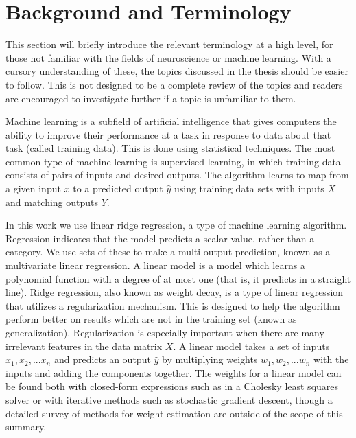 \section{Background and Terminology}

This section will briefly introduce the relevant terminology at a high level, 
for those not familiar with the fields of neuroscience or machine learning.  
With a cursory understanding of these, the topics discussed in the thesis 
should be easier to follow. This is not designed to be a complete review of the 
topics and readers are encouraged to investigate further if a topic is 
unfamiliar to them.

Machine learning is a subfield of artificial intelligence that gives computers 
the ability to improve their performance at a task in response to data about 
that task (called training data). This is done using statistical techniques.  
The most common type of machine learning is supervised learning, in which 
training data consists of pairs of inputs and desired outputs. The algorithm 
learns to map from a given input $x$ to a predicted output $\hat{y}$ using 
training data sets with inputs $X$ and matching outputs $Y$.

In this work we use linear ridge regression, a type of machine learning 
algorithm. Regression indicates that the model predicts a scalar value, rather 
than a category. We use sets of these to make a multi-output prediction, known 
as a multivariate linear regression. A linear model is a model which learns a 
polynomial function with a degree of at most one (that is, it predicts in a 
straight line). Ridge regression, also known as weight decay, is a type of 
linear regression that utilizes a regularization mechanism. This is designed to 
help the algorithm perform better on results which are not in the training set 
(known as generalization). Regularization is especially important when there 
are many irrelevant features in the data matrix $X$.  A linear model takes a 
set of inputs $x_1, x_2, ...  x_n$ and predicts an output $\hat{y}$ by 
multiplying weights $w_1, w_2, ...  w_n$ with the inputs and adding the 
components together. The weights for a linear model can be found both with
closed-form expressions such as in a Cholesky least squares solver or with 
iterative methods such as stochastic gradient descent, though a detailed survey 
of methods for weight estimation are outside of the scope of this summary.


